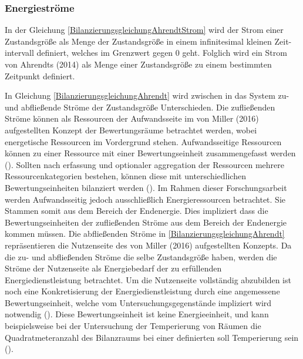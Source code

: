 
\subsubsection{Energieströme}
In der Gleichung \eqref{BilanzierungsgleichungAhrendtStrom} wird der Strom einer Zustandsgröße als Menge der Zustandsgröße in einem infinitesimal kleinen Zeit-
intervall definiert, welches im Grenzwert gegen 0 geht. Folglich wird ein Strom von Ahrendts (2014) als Menge einer Zustandsgröße zu einem bestimmten Zeitpunkt 
definiert. 

In Gleichung \eqref{BilanzierungsgleichungAhrendt} wird zwischen in das System zu- und abfließende Ströme der Zustandsgröße Unterschieden.
Die zufließenden Ströme können als Ressourcen der Aufwandsseite im von Miller (2016) aufgestellten Konzept der Bewertungsräume betrachtet werden, 
wobei energetische Ressourcen im Vordergrund stehen. Aufwandsseitige Ressourcen können zu einer Ressource mit einer Bewertungseinheit 
zusammengefasst werden (\cite[S. 112]{Miller.2016}). Sollten nach erfassung und optionaler aggregation der Ressourcen mehrere Ressourcenkategorien bestehen, 
können diese mit unterschiedlichen Bewertungseinheiten bilanziert werden (\cite[S. 112]{Miller.2016}). Im Rahmen dieser Forschungsarbeit werden 
Aufwandsseitig jedoch ausschließlich Energieressourcen betrachtet.
Sie Stammen somit aus dem Bereich der Endenergie. Dies impliziert dass die Bewertungseinheiten der zufließenden Ströme aus dem Bereich der Endenergie 
kommen müssen.
Die abfließenden Ströme in \eqref{BilanzierungsgleichungAhrendt} repräsentieren die Nutzenseite des von Miller (2016) aufgestellten Konzepts.
Da die zu- und abfließenden Ströme die selbe Zustandsgröße haben, werden die Ströme der Nutzenseite als Energiebedarf der zu erfüllenden 
Energiedienstleistung betrachtet.
Um die Nutzenseite vollständig abzubilden ist noch eine Konkretisierung der Energiedienstleistung durch eine angemessene Bewertungseinheit, 
welche vom Untersuchungsgegenstände impliziert wird notwendig (\cite{Miller.2016}). Diese Bewertungseinheit ist keine Energieeinheit, und 
kann beispielsweise bei der Untersuchung der Temperierung von Räumen die Quadratmeteranzahl des Bilanzraums bei einer definierten 
soll Temperierung sein (\cite{Miller.2016}).


